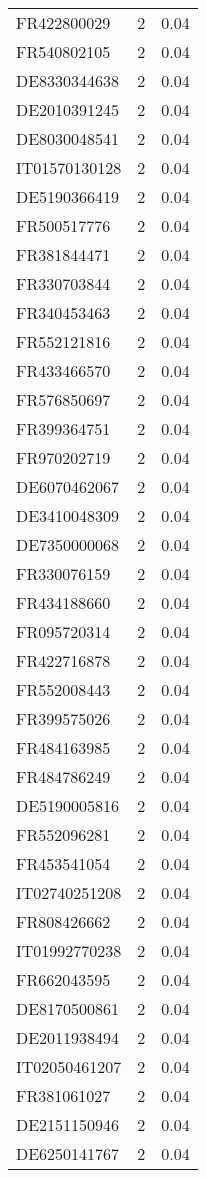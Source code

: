 \begin{table*}[htbp]
\begin{tabular}{lrr}
FR422800029 & 2 & 0.04 \\
FR540802105 & 2 & 0.04 \\
DE8330344638 & 2 & 0.04 \\
DE2010391245 & 2 & 0.04 \\
DE8030048541 & 2 & 0.04 \\
IT01570130128 & 2 & 0.04 \\
DE5190366419 & 2 & 0.04 \\
FR500517776 & 2 & 0.04 \\
FR381844471 & 2 & 0.04 \\
FR330703844 & 2 & 0.04 \\
FR340453463 & 2 & 0.04 \\
FR552121816 & 2 & 0.04 \\
FR433466570 & 2 & 0.04 \\
FR576850697 & 2 & 0.04 \\
FR399364751 & 2 & 0.04 \\
FR970202719 & 2 & 0.04 \\
DE6070462067 & 2 & 0.04 \\
DE3410048309 & 2 & 0.04 \\
DE7350000068 & 2 & 0.04 \\
FR330076159 & 2 & 0.04 \\
FR434188660 & 2 & 0.04 \\
FR095720314 & 2 & 0.04 \\
FR422716878 & 2 & 0.04 \\
FR552008443 & 2 & 0.04 \\
FR399575026 & 2 & 0.04 \\
FR484163985 & 2 & 0.04 \\
FR484786249 & 2 & 0.04 \\
DE5190005816 & 2 & 0.04 \\
FR552096281 & 2 & 0.04 \\
FR453541054 & 2 & 0.04 \\
IT02740251208 & 2 & 0.04 \\
FR808426662 & 2 & 0.04 \\
IT01992770238 & 2 & 0.04 \\
FR662043595 & 2 & 0.04 \\
DE8170500861 & 2 & 0.04 \\
DE2011938494 & 2 & 0.04 \\
IT02050461207 & 2 & 0.04 \\
FR381061027 & 2 & 0.04 \\
DE2151150946 & 2 & 0.04 \\
DE6250141767 & 2 & 0.04 \\

\end{tabular}
\end{table*}
